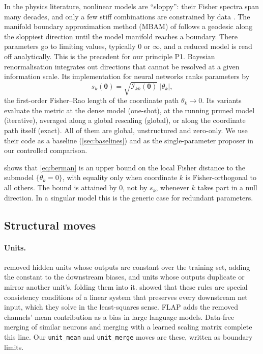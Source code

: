 \documentclass[11pt,a4paper]{article}
\theoremstyle{definition}
\newcommand{\bth}{\boldsymbol\theta}
\newcommand{\Fis}{\mathcal{I}}
\newcommand{\code}[1]{\texttt{#1}}
\begin{document}
In the physics literature, nonlinear models are ``sloppy'': their Fisher spectra span
many decades, and only a few stiff combinations are constrained by data
\citep{transtrum2011geometry,machta2013,transtrum2015,Quinn2021}. The manifold boundary
approximation method (MBAM) of \citet{transtrum2014} follows a geodesic along the
sloppiest direction until the model manifold reaches a boundary. There parameters go
to limiting values, typically $0$ or $\infty$, and a reduced model is read off
analytically. This is the precedent for our principle P1. Bayesian renormalisation
\citep{berman2023,howard2025} integrates out directions that cannot be resolved at a
given information scale. Its implementation for neural networks
\citep{berman2026fdist} ranks parameters by
\begin{equation}
s_k(\bth) = \sqrt{\Fis_{kk}(\bth)}\;|\theta_k|,
\label{eq:berman}
\end{equation}
the first-order Fisher--Rao length of the coordinate path $\theta_k\to0$. Its variants
evaluate the metric at the dense model (one-shot), at the running pruned model
(iterative), averaged along a global rescaling (global), or along the coordinate
path itself (exact). All of them are global, unstructured and zero-only. We use their
code as a baseline (\cref{sec:baselines}) and as the single-parameter proposer in our
controlled comparison.

 shows that \eqref{eq:berman} is an upper bound on the local
Fisher distance to the submodel $\{\theta_k=0\}$, with equality only when coordinate
$k$ is Fisher-orthogonal to all others. The bound is attained by $0$, not by $s_k$,
whenever $k$ takes part in a null direction. In a singular model this is the generic
case for redundant parameters.

\subsection{Structural moves}
\label{sec:rel-struct}

\paragraph{Units.} \citet{sietsma1988pruning,sietsma1991creating} removed hidden units
whose outputs are constant over the training set, adding the constant to the
downstream biases, and units whose outputs duplicate or mirror another unit's, folding
them into it. \citet{castellano1997iterative} showed that these rules are special
consistency conditions of a linear system that preserves every downstream net input,
which they solve in the least-squares sense. FLAP \citep{an2024flap} adds the removed
channels' mean contribution as a bias in large language models. Data-free merging of
similar neurons \citep{srinivas2015datafree} and merging with a learned scaling matrix
\citep{kim2020merging} complete this line. Our \code{unit\_mean} and \code{unit\_merge}
moves are these, written as boundary limits.
\end{document}
